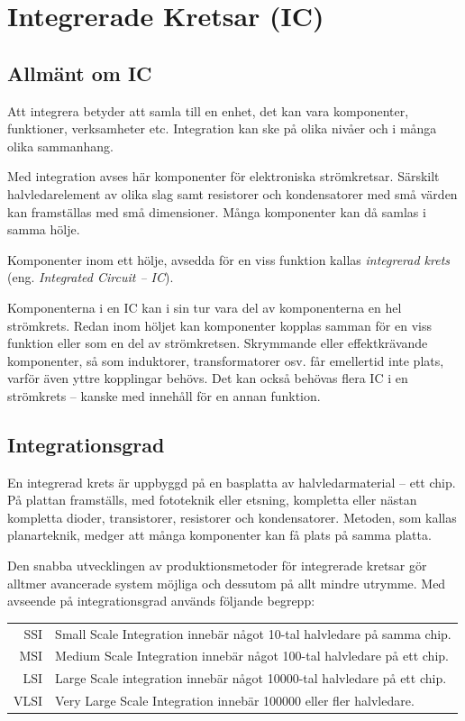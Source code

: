 \section{Integrerade Kretsar (IC)}

\subsection{Allmänt om IC}

Att integrera betyder att samla till en enhet, det kan vara komponenter,
funktioner, verksamheter etc. Integration kan ske på olika nivåer och i många
olika sammanhang.

Med integration avses här komponenter för elektroniska strömkretsar. Särskilt
halvledarelement av olika slag samt resistorer och kondensatorer med små värden
kan framställas med små dimensioner. Många komponenter kan då samlas i samma
hölje.

Komponenter inom ett hölje, avsedda för en viss funktion kallas
\emph{integrerad krets} (eng. \emph{Integrated Circuit -- IC}).

Komponenterna i en IC kan i sin tur vara del av komponenterna en hel strömkrets.
Redan inom höljet kan komponenter kopplas samman för en viss funktion eller som
en del av strömkretsen. Skrymmande eller effektkrävande komponenter, så som
induktorer, transformatorer osv. får emellertid inte plats, varför även yttre
kopplingar behövs. Det kan också behövas flera IC i en strömkrets -- kanske med
innehåll för en annan funktion.

\subsection{Integrationsgrad}

En integrerad krets är uppbyggd på en basplatta av halvledarmaterial --
ett chip.
På plattan framställs, med fototeknik eller etsning, kompletta eller nästan
kompletta dioder, transistorer, resistorer och kondensatorer. Metoden, som
kallas planarteknik, medger att många komponenter kan få plats på samma platta.

Den snabba utvecklingen av produktionsmetoder för integrerade kretsar gör
alltmer avancerade system möjliga och dessutom på allt mindre utrymme. Med
avseende på integrationsgrad används följande begrepp:

\begin{table}[h]
	\centering
\begin{tabular}{rl}
	 SSI & Small Scale Integration innebär något \num{10}-tal halvledare på samma chip.  \\
	 MSI & Medium Scale Integration innebär något \num{100}-tal halvledare på ett chip.  \\
	 LSI & Large Scale integration innebär något \num{10000}-tal halvledare på ett chip. \\
	VLSI & Very Large Scale Integration innebär \num{100000} eller fler halvledare.
\end{tabular}
\end{table}

